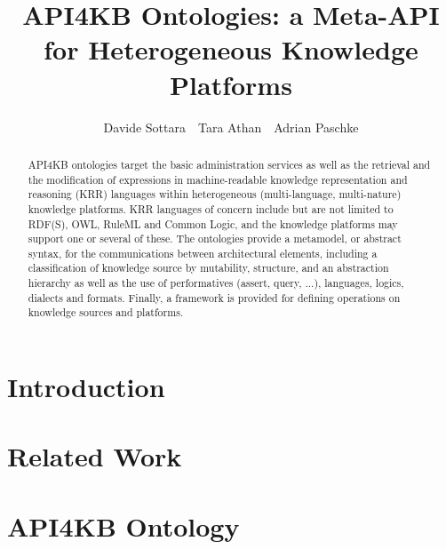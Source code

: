 \documentclass[runningheads]{llncs}
\title{API4KB Ontologies: a Meta-API for Heterogeneous Knowledge Platforms}
\date{}
\begin{document}
%
\author{Davide Sottara\ \ Tara Athan\ \ Adrian Paschke}

%
\maketitle

\begin{abstract}
API4KB ontologies target the basic administration
services as well as the retrieval and the modification of expressions in machine-readable knowledge representation and reasoning (KRR) languages within heterogeneous (multi-language, multi-nature) knowledge platforms.
KRR languages of concern include but are not limited to RDF(S), OWL, RuleML and Common Logic, and the knowledge platforms may support one or several of these.
The ontologies provide a metamodel, or abstract syntax, for the communications between architectural elements, including a classification of knowledge source by mutability, structure, and an abstraction hierarchy as well as the use of performatives (assert, query, ...), languages, logics, dialects and formats. Finally, a framework is provided for defining operations on knowledge sources and platforms.
\end{abstract}

%
\section{Introduction}
\label{intro}



\section{Related Work}

\section{API4KB Ontology}
\end{document}
